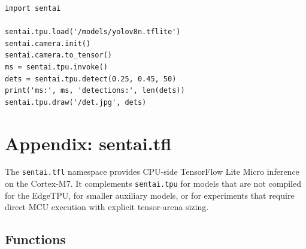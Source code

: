 \begin{verbatim}
import sentai

sentai.tpu.load('/models/yolov8n.tflite')
sentai.camera.init()
sentai.camera.to_tensor()
ms = sentai.tpu.invoke()
dets = sentai.tpu.detect(0.25, 0.45, 50)
print('ms:', ms, 'detections:', len(dets))
sentai.tpu.draw('/det.jpg', dets)
\end{verbatim}

\section{Appendix: sentai.tfl}\label{appendix-sentai.tfl}

The \texttt{sentai.tfl} namespace provides CPU-side TensorFlow Lite
Micro inference on the Cortex-M7. It complements \texttt{sentai.tpu} for
models that are not compiled for the EdgeTPU, for smaller auxiliary
models, or for experiments that require direct MCU execution with
explicit tensor-arena sizing.

\subsection{Functions}\label{functions-3}

